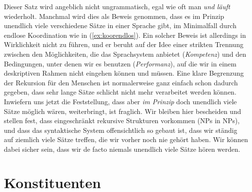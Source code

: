 \begin{exe}
\end{exe}

Dieser Satz wird angeblich nicht ungrammatisch, egal wie oft man \textit{und läuft} wiederholt.
Manchmal wird dies als Beweis genommen, dass es im Prinzip unendlich viele verschiedene Sätze in einer Sprache gibt, im Minimalfall durch endlose Koordination wie in (\ref{ex:koorendlos}).
Ein solcher Beweis ist allerdings in Wirklichkeit nicht zu führen, und er beruht auf der Idee einer strikten Trennung zwischen den Möglichkeiten, die das Sprachsystem anbietet (\textit{Kompetenz}) und den Bedingungen, unter denen wir es benutzen (\textit{Performanz}), auf die wir in einem deskriptiven Rahmen nicht eingehen können und müssen.
Eine klare Begrenzung der Rekursion für den Menschen ist normalerweise ganz einfach schon dadurch gegeben, dass sehr lange Sätze schlicht nicht mehr verarbeitet werden können.
Inwiefern uns jetzt die Feststellung, dass aber \textit{im Prinzip} doch unendlich viele Sätze möglich wären, weiterbringt, ist fraglich.
Wir bleiben hier bescheiden und stellen fest, dass eingeschränkt rekursive Strukturen vorkommen (\zB NPs in NPs), und dass das syntaktische System offensichtlich so gebaut ist, dass wir ständig auf ziemlich viele Sätze treffen, die wir vorher noch nie gehört haben.
Wir können dabei sicher sein, dass wir de facto niemals unendlich viele Sätze hören werden.




\section{Konstituenten}

